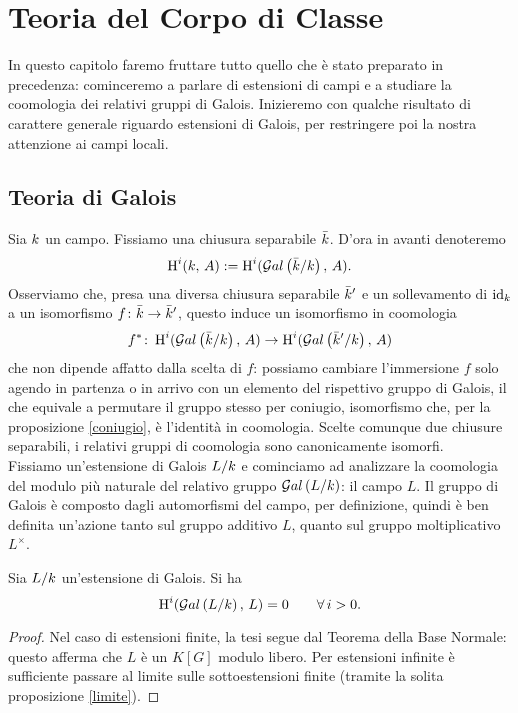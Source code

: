 \chapter{Teoria del Corpo di Classe}
In questo capitolo faremo fruttare tutto quello che è stato preparato in precedenza: cominceremo a parlare di estensioni di campi e a studiare la coomologia dei relativi gruppi di Galois. Inizieremo con qualche risultato di carattere generale riguardo estensioni di Galois, per restringere poi la nostra attenzione ai campi locali.




\section{Teoria di Galois}
Sia $ k $ un campo. Fissiamo una chiusura separabile $ \bar{k} $. D'ora in avanti denoteremo
\[ \operatorname{H}^i(k, \, A) := \operatorname{H}^i(\mathcal{G}al\left( \bar{k} / k \right), \, A). \]
Osserviamo che, presa una diversa chiusura separabile $ \bar{k}' $ e un sollevamento di $ \operatorname{id}_{k} $ a un isomorfismo $ f\colon \bar{k} \to \bar{k}' $, questo induce un isomorfismo in coomologia
\[ f^* \colon \operatorname{H}^i(\mathcal{G}al\left( \bar{k} / k \right), \, A) \to \operatorname{H}^i(\mathcal{G}al\left( \bar{k}' / k \right), \, A) \]
che non dipende affatto dalla scelta di $ f $: possiamo cambiare l'immersione $ f $ solo agendo in partenza o in arrivo con un elemento del rispettivo gruppo di Galois, il che equivale a permutare il gruppo stesso per coniugio, isomorfismo che, per la proposizione \ref{coniugio}, è l'identità in coomologia. Scelte comunque due chiusure separabili, i relativi gruppi di coomologia sono canonicamente isomorfi.\\


Fissiamo un'estensione di Galois $ L/k $ e cominciamo ad analizzare la coomologia del modulo più naturale del relativo gruppo $ \mathcal{G}al\left( L/k \right) $: il campo $ L $. Il gruppo di Galois è composto dagli automorfismi del campo, per definizione, quindi è ben definita un'azione tanto sul gruppo additivo $ L $, quanto sul gruppo moltiplicativo $ L^\times $.

\begin{theorem} \label{Hadd}
	Sia $ L / k $ un'estensione di Galois. Si ha
	\[ \operatorname{H}^i(\mathcal{G}al\left(  L / k \right), \, L) = 0 \qquad \forall \, i > 0. \]
\end{theorem}
\begin{proof}
	Nel caso di estensioni finite, la tesi segue dal Teorema della Base Normale: questo afferma che $ L $ è un $ K[G] $ modulo libero. Per estensioni infinite è sufficiente passare al limite sulle sottoestensioni finite (tramite la solita proposizione \ref{limite}).
\end{proof}

